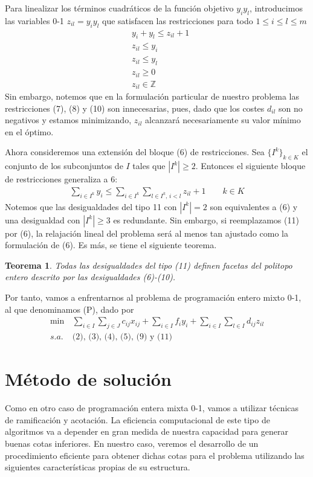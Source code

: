 \documentclass[twoside,12pt]{article}
\newtheorem{theorem}{Teorema}
\begin{document}
\newpage
Para linealizar los términos cuadráticos de la función objetivo $y_iy_l$, introducimos las variables 0-1 $z_{il} = y_iy_l$ que satisfacen las restricciones para todo $1\leq i \leq l \leq m$
\begin{align}
&y_i+y_l\leq z_{il}+1\\
&z_{il} \leq y_i\\
&z_{il}\leq y_l\\
&z_{il}\geq 0\\
&z_{il}\in \mathbb{Z}
\end{align}
Sin embargo, notemos que en la formulación particular de nuestro problema las restricciones (7), (8) y (10) son innecesarias, pues, dado que los costes $d_{il}$ son no negativos y estamos minimizando, $z_{il}$ alcanzará necesariamente su valor mínimo en el óptimo. 

Ahora consideremos una extensión del bloque (6) de restricciones. Sea $\{I^k\}_{k\in K}$ el conjunto de los subconjuntos de $I$ tales que $|I^k|\geq 2$. Entonces el siguiente bloque de restricciones generaliza a 6:
\begin{align}
\sum_{i\in I^k} y_i \leq  \sum_{i\in I^k} \sum_{l\in I^k,\,i<l} z_{il} +1 \qquad k\in K
\end{align}
Notemos que las desigualdades del tipo 11 con $|I^k| =2$ son equivalentes a (6) y una desigualdad con $|I^k|\geq 3$ es redundante. Sin embargo, si reemplazamos (11) por (6), la relajación lineal del problema será al menos tan ajustado como la formulación de (6). Es más, se tiene el siguiente teorema.
\begin{theorem}Todas las desigualdades del tipo (11) definen facetas del politopo entero descrito por las desigualdades (6)-(10). 
\end{theorem}
Por tanto, vamos a enfrentarnos al problema de programación entero mixto 0-1, al que denominamos (P), dado por
\begin{align*}
\min \,& \sum_{i\in I} \sum_{j\in J} c_{ij}x_{ij} + \sum_{i\in I} f_i y_i + \sum_{i \in I}\sum_{l \in I} d_{ij}z_{il}\\
s.a.\,& \text{(2), (3), (4), (5), (9) y (11)}
\end{align*}
\section{Método de solución}
Como en otro caso de programación entera mixta 0-1, vamos a utilizar técnicas de ramificación y acotación. La eficiencia computacional de este tipo de algoritmos va a depender en gran medida de nuestra capacidad para generar buenas cotas inferiores. En nuestro caso, veremos el desarrollo de un procedimiento eficiente para obtener dichas cotas para el problema utilizando las siguientes características propias de su estructura.
\end{document}
